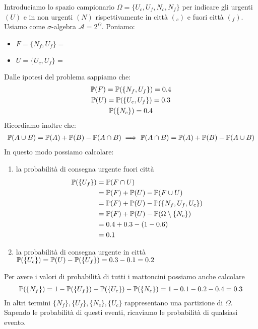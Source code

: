 Introduciamo lo spazio campionario $\Omega =\{U_{c} ,U_{f} ,N_{c} ,N_{f}\}$ per indicare gli urgenti $( U)$ e in non urgenti $( N)$ rispettivamente in città $(_{c})$ e fuori città $(_{f})$. Usiamo come $\sigma $-algebra $\mathcal{A} =2^{\Omega }$. Poniamo:
\begin{itemize}
	\item $F=\{N_{f} ,U_{f}\} =$ 
	\item $U=\{U_{c} ,U_{f}\} =$ 
\end{itemize}
Dalle ipotesi del problema sappiamo che:
\begin{gather*}
	\mathbb{P}( F) =\mathbb{P}(\{N_{f} ,U_{f}\}) =0.4\\
	\mathbb{P}( U) =\mathbb{P}(\{U_{c} ,U_{f}\}) =0.3\\
	\mathbb{P}(\{N_{c}\}) =0.4
\end{gather*}
Ricordiamo inoltre che:
\begin{gather*}
	\mathbb{P}( A\cup B) =\mathbb{P}( A) +\mathbb{P}( B) -\mathbb{P}( A\cap B) \implies \mathbb{P}( A\cap B) =\mathbb{P}( A) +\mathbb{P}( B) -\mathbb{P}( A\cup B)
\end{gather*}
In questo modo possiamo calcolare:
\begin{enumerate}
	\item la probabilità di consegna urgente fuori città
	\begin{align*}
		\mathbb{P}(\{U_{f}\}) & =\mathbb{P}( F\cap U)\\
		& =\mathbb{P}( F) +\mathbb{P}( U) -\mathbb{P}( F\cup U)\\
		& =\mathbb{P}( F) +\mathbb{P}( U) -\mathbb{P}(\{N_{f} ,U_{f} ,U_{c}\})\\
		& =\mathbb{P}( F) +\mathbb{P}( U) -\mathbb{P}( \Omega \setminus \{N_{c}\})\\
		& =0.4+0.3-( 1-0.6)\\
		& =0.1
	\end{align*}
	\item la probabilità di consegna urgente in città
	$\mathbb{P}(\{U_{c}\}) =\mathbb{P}( U) -\mathbb{P}(\{U_{f}\}) =0.3-0.1=0.2$
\end{enumerate}
\begin{oss}
	Per avere i valori di probabilità di tutti i mattoncini possiamo anche calcolare
	\begin{equation*}
		\mathbb{P}(\{N_{f}\}) =1-\mathbb{P}(\{U_{f}\}) -\mathbb{P}(\{U_{c}\}) -\mathbb{P}(\{N_{c}\}) =1-0.1-0.2-0.4=0.3
	\end{equation*}
	In altri termini $\{N_{f}\} ,\{U_{f}\} ,\{N_{c}\} ,\{U_{c}\}$ rappresentano una partizione di $\Omega $. Sapendo le probabilità di questi eventi, ricaviamo le probabilità di qualsiasi evento.
\end{oss}

